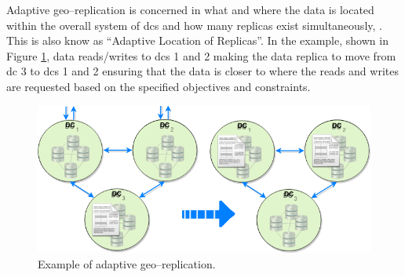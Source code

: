 \documentclass[english]{article}
\begin{document}
Adaptive geo--replication is concerned in what and where the data is located within the overall system of \glspl{dc} and how many replicas exist simultaneously, \cite{Jeon2014a, Ardekani2014a, KingsyGrace2013a, Wang2012a, Abad2011a, Abdul-Wahid2007a, Loukopoulos2004a}. This is also know as \textquotedblleft Adaptive Location of Replicas\textquotedblright. In the example, shown in Figure \ref{fig:adaptive_replication}, data reads/writes to \glspl{dc} 1 and 2 making the data replica to move from \gls{dc} 3 to \glspl{dc} 1 and 2 ensuring that the data is closer to where the reads and writes are requested based on the specified objectives and constraints.
\begin{figure}[ht!]
	\centering
	\includegraphics[width=1\textwidth]{adaptiveReplication.png}
	
	\caption{Example of adaptive geo--replication.}
	\label{fig:adaptive_replication}
\end{figure}
\end{document}
